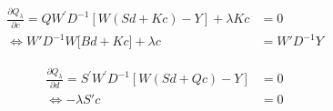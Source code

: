 \begin{align}
\frac{\partial Q_\lambda}{\partial c} = Q W^\prime D^{-1}\left[ W\left(Sd + Kc\right) - Y  \right] + \lambda Kc &= 0 \nonumber \\
\iff    W'D^{-1} W \bigg[ Bd + Kc \bigg] + \lambda c  &= W' D^{-1}Y \label{eq:normal-eq-1}
\end{align}
\noindent

\begin{align*}
\frac{\partial Q_\lambda}{\partial d} = S^\prime W^\prime D^{-1}\left[ W\left(Sd + Qc\right) - Y  \right] &=0 \nonumber \\
\iff   - \lambda S' c  &= 0  
\end{align*}
\bigskip
\noindent




